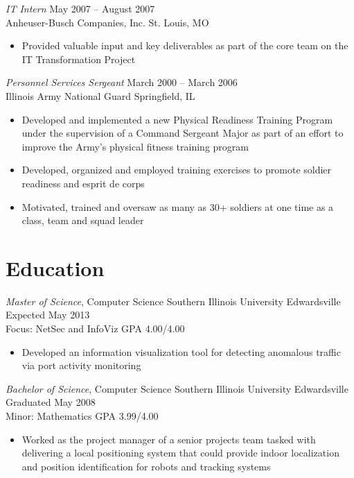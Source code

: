 \documentclass[margin,line]{resume}
\begin{document}
\begin{resume}
{\sl IT Intern}                     \hfill  May 2007 -- August 2007\\
Anheuser-Busch Companies, Inc.      \hfill  St. Louis, MO
\begin{itemize} \itemsep -2pt %
\small\item Provided valuable input and key deliverables as part of the core team on the IT Transformation Project
\end{itemize}

{\sl Personnel Services Sergeant}   \hfill   March 2000 -- March 2006\\
Illinois Army National Guard        \hfill   Springfield, IL
\begin{itemize} \itemsep -2pt %
\small\item Developed and implemented a new Physical Readiness Training Program under the supervision of a
            Command Sergeant Major as part of an effort to improve the Army's physical fitness training program
\small\item Developed, organized and employed training exercises to promote soldier readiness and esprit de corps
\small\item Motivated, trained and oversaw as many as 30+ soldiers at one time as a class, team and squad leader
\end{itemize}

\section{Education}
{\small
  {\sl Master of Science}, Computer Science \hfill
  Southern Illinois University Edwardsville \hfill
  Expected May 2013\\
  Focus: NetSec and InfoViz \hfill
  GPA 4.00/4.00
}
\begin{itemize} \itemsep -2pt %
\small\item[] Developed an information visualization tool for detecting anomalous traffic via port activity monitoring
\end{itemize}

{\small
  {\sl Bachelor of Science}, Computer Science \hfill
  Southern Illinois University Edwardsville   \hfill
  Graduated May 2008\\
  Minor: Mathematics \hfill
  GPA 3.99/4.00
}
\begin{itemize} \itemsep -2pt %
\small\item[] Worked as the project manager of a senior projects team tasked with delivering a local positioning
            system that could provide indoor localization and position identification for robots and tracking systems
\end{itemize}


\end{resume}
\end{document}
